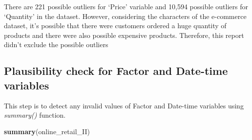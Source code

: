 \documentclass[
]{article}
\newenvironment{Shaded}{\begin{snugshade}}{\end{snugshade}}
\newcommand{\KeywordTok}[1]{\textcolor[rgb]{0.13,0.29,0.53}{\textbf{#1}}}
\newcommand{\NormalTok}[1]{#1}
\begin{document}
There are 221 possible outliers for `Price' variable and 10,594 possible
outliers for `Quantity' in the dataset. However, considering the
characters of the e-commerce dataset, it's possible that there were
customers ordered a huge quantity of products and there were also
possible expensive products. Therefore, this report didn't exclude the
possible outliers

\hypertarget{plausibility-check-for-factor-and-date-time-variables}{%
\subsection{Plausibility check for Factor and Date-time
variables}\label{plausibility-check-for-factor-and-date-time-variables}}

This step is to detect any invalid values of Factor and Date-time
variables using \emph{summary()} function.

\begin{Shaded}
\begin{Highlighting}[]
\KeywordTok{summary}\NormalTok{(online_retail_II)}
\end{Highlighting}
\end{Shaded}
\end{document}
